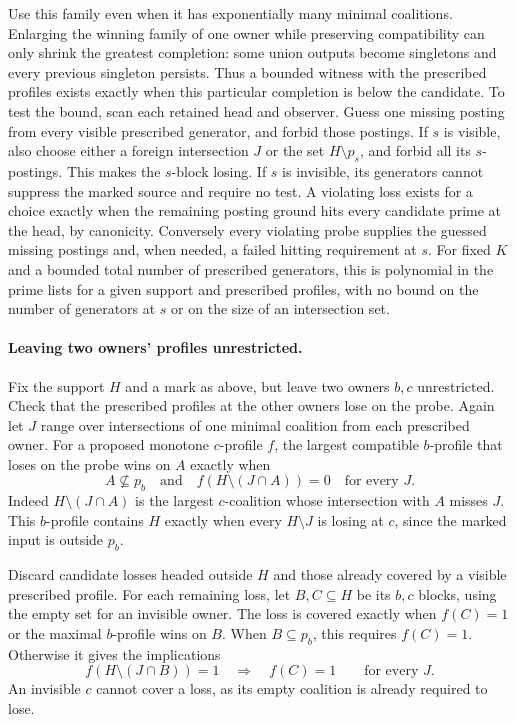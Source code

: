 Use this family even when it has exponentially many minimal
coalitions. Enlarging the winning family of one owner while
preserving compatibility can only shrink the greatest completion:
some union outputs become singletons and every previous singleton
persists. Thus a bounded witness with the prescribed profiles
exists exactly when this particular completion is below the
candidate. To test the bound, scan each retained head and
observer. Guess one missing posting from every visible prescribed
generator, and forbid those postings. If $s$ is visible, also
choose either a foreign intersection $J$ or the set
$H\setminus p_s$, and forbid all its $s$-postings. This makes the
$s$-block losing. If $s$ is invisible, its generators cannot
suppress the marked source and require no test. A violating loss
exists for a choice exactly when the remaining posting ground
hits every candidate prime at the head, by canonicity. Conversely
every violating probe supplies the guessed missing postings and,
when needed, a failed hitting requirement at $s$.
For fixed $K$ and a bounded total number of prescribed
generators, this is polynomial in the prime lists for a given
support and prescribed profiles, with no bound on the number
of generators at $s$ or on the size of an intersection set.

\paragraph{Leaving two owners' profiles unrestricted.}
Fix the support $H$ and a mark as above, but leave two owners
$b,c$ unrestricted. Check that the prescribed profiles at the
other owners lose on the probe. Again let $J$ range over
intersections of one minimal coalition from each prescribed
owner. For a proposed monotone $c$-profile $f$, the largest
compatible $b$-profile that loses on the probe wins on $A$
exactly when
\[
 A\not\subseteq p_b
 \quad\text{and}\quad
 f(H\setminus(J\cap A))=0\quad\text{for every }J .
\]
Indeed $H\setminus(J\cap A)$ is the largest $c$-coalition
whose intersection with $A$ misses $J$. This $b$-profile
contains $H$ exactly when every $H\setminus J$ is losing
at $c$, since the marked input is outside $p_b$.

Discard candidate losses headed outside $H$ and those
already covered by a visible prescribed profile. For each
remaining loss, let $B,C\subseteq H$ be its $b,c$ blocks,
using the empty set for an invisible owner. The loss is
covered exactly when $f(C)=1$ or the maximal $b$-profile
wins on $B$. When $B\subseteq p_b$, this requires $f(C)=1$.
Otherwise it gives the implications
\[
 f(H\setminus(J\cap B))=1\quad\Longrightarrow\quad f(C)=1
 \qquad\text{for every }J .
\]
An invisible $c$ cannot cover a loss, as its empty coalition
is already required to lose.


